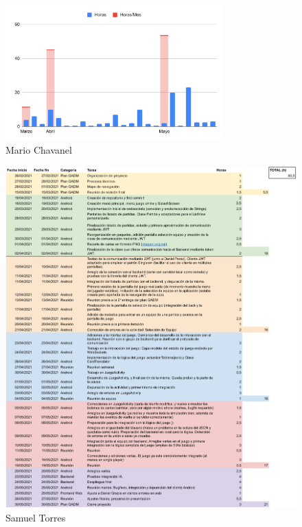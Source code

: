 \documentclass{article}
\begin{document}
\begin{figure}[h]
    \centering
    \includegraphics[width=0.75\textwidth]{../images/graficos/MARIO}
    \caption{Mario Chavanel}
\end{figure}

\begin{figure}[h]
    \centering
    \includegraphics[width=\textwidth]{../images/horasTrabajadas/samuel-torres.pdf}
    \caption{Samuel Torres}
\end{figure}
\end{document}
